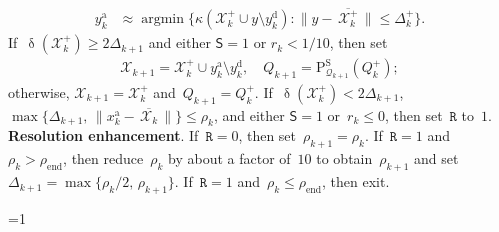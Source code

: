 \documentclass[11pt,a4paper,draft]{article}  %
\newcommand{\bibfile}{\jobname.bib}  %
\newcommand{\iscite}{0}  %
\theoremstyle{definition}
\numberwithin{equation}{section}
\newcommand{\mbar}[1]{\,\overline{\!{#1}\!}\,} %
\newcommand{\xopt}{\mbar}
\DeclareMathOperator{\xdist}{\updelta}
\DeclareMathOperator*{\argmin}{argmin}
\newcommand{\shortd}{\mathsf{S}}
\newcommand{\redrho}{\mathtt{R}}
\newcommand{\Int}{\mathcal{X}}
\newcommand{\Qua}{\mathcal{Q}}
\newcommand{\sss}[1]{{\scriptscriptstyle{#1}}}
\newcommand{\add}{{\textrm{a}}}
\newcommand{\drop}{{\textrm{d}}}
\newcommand{\new}{{\sss{+}}}
\newcommand{\fin}{{\textrm{end}}}
\newcommand{\sob}{{\scriptscriptstyle{\textrm{S}}}}
\newcommand{\Projs}{\mathrm{P}^\sob}
\begin{document}
\begin{algorithm}[htbp!]
\begin{algorithmic}[1]
\begin{align}
              \label{eq:yaddn}
              y_k^\add &\approx \argmin\{\kappa(\Int^{\new}_k \cup y \setminus y_k^\drop) \mathrel{:}
              \|y-\xopt{\Int^{\new}_k}\|\le \Delta^{\new}_k\}.
          \end{align}
        If~$\xdist(\Int^\new_k)\ge 2\Delta_{k+1}$ and either $\shortd = 1$ or $r_k < 1/10$, then set
          \begin{align}
            \label{eq:updateq2}
              \Int_{k+1} = \Int^{\new}_k\cup y_k^\add\setminus y_k^\drop,
              \quad
              Q_{k+1} = \Projs_{\Qua_{k+1}}(Q_k^\new) ;
          \end{align}
          otherwise, $\Int_{k+1} = \Int_k^\new$ and~$Q_{k+1} = Q_k^{\new}$.
          If~$\xdist(\Int_k^{\new}) < 2\Delta_{k+1}$, $\max\{\Delta_{k+1},\, \|x_k^\add
          - \xopt{\Int_k}\|\}\le \rho_k$, and either $\shortd=1$ or~$r_k\le 0$,
          then set~$\redrho$ to~$1$.
       \State \textbf{Resolution enhancement}.
       If~$\redrho = 0$, then set~$\rho_{k+1} = \rho_k$.
       If~$\redrho = 1$ and~$\rho_k >\rho_{\fin}$, then reduce~$\rho_k$ by about a factor of~$10$ to
       obtain~$\rho_{k+1}$ and set~$\Delta_{k+1} = \max\{\rho_{k}/2,\, \rho_{k+1}\}$.
       If~$\redrho = 1$ and~$\rho_k\le\rho_{\fin}$, then exit.
    \end{algorithmic}
\end{algorithm}


\ifnum\iscite=1
    \small
    
    
\fi

\end{document}
